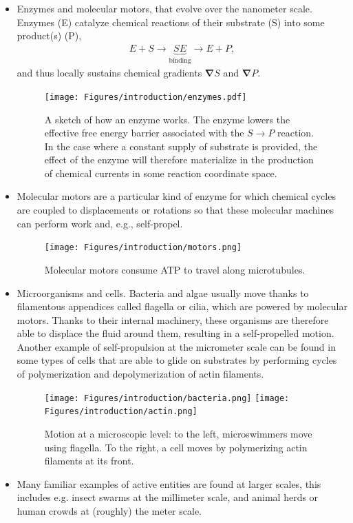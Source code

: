 \begin{itemize}
    \item Enzymes and molecular motors, that evolve over the nanometer scale. Enzymes (E) catalyze chemical reactions of their substrate (S) into some product(s) (P),
    \begin{align}
        E + S \longrightarrow  \underbrace{SE}_{\mathrm{binding}} \longrightarrow  E + P,
    \end{align}
     and thus locally sustains chemical gradients $\bm \nabla S$ and $\bm \nabla P$. 
     \begin{figure}[H]
        \centering
        \texttt{[image: Figures/introduction/enzymes.pdf]}
        \caption{A sketch of how an enzyme works. The enzyme lowers the effective free energy barrier associated with the $S \to P$ reaction. In the case where a constant supply of substrate is provided, the effect of the enzyme will therefore materialize in the production of chemical currents in some reaction coordinate space.}
        \label{fig: enzymes}
    \end{figure}
    \item Molecular motors are a particular kind of enzyme for which chemical cycles are coupled to displacements or rotations so that these molecular machines can perform work and, e.g., self-propel.
     \begin{figure}[!h]
        \centering
        \texttt{[image: Figures/introduction/motors.png]}
        \caption{Molecular motors consume ATP to travel along microtubules.}
        \label{fig: motors}
     \end{figure}
    \item Microorganisms and cells. Bacteria and algae usually move thanks to filamentous appendices called flagella or cilia, which are powered by molecular motors.
    Thanks to their internal machinery, these organisms are therefore able to displace the fluid around them, resulting in a self-propelled motion.
    Another example of self-propulsion at the micrometer scale can be found in some types of cells that are able to glide on substrates by performing cycles of polymerization and depolymerization of actin filaments.
    \begin{figure}[!h]
        \centering
        \texttt{[image: Figures/introduction/bacteria.png]} 
        \hspace{2cm}
        \texttt{[image: Figures/introduction/actin.png]}
        \caption{Motion at a microscopic level: to the left, microswimmers move using flagella. 
        To the right, a cell moves by polymerizing actin filaments at its front.}
        \label{fig: label}
    \end{figure}
    \item Many familiar examples of active entities are found at larger scales, this includes e.g. insect swarms at the millimeter scale, and animal herds or human crowds at (roughly) the meter scale.
\end{itemize}



